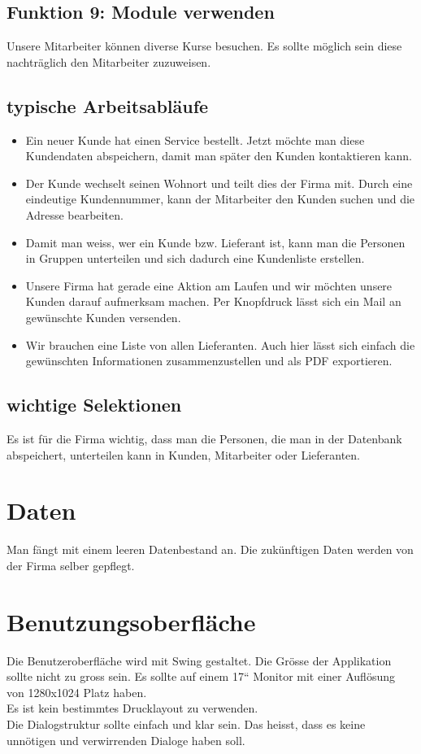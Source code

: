 \subsection{Funktion 9: Module verwenden}
Unsere Mitarbeiter können diverse Kurse besuchen. Es sollte möglich sein diese
nachträglich den Mitarbeiter zuzuweisen.

\subsection{typische Arbeitsabläufe}
\begin{itemize}
\item Ein neuer Kunde hat einen Service bestellt. Jetzt möchte man diese
Kundendaten abspeichern, damit man später den Kunden kontaktieren kann.
\item Der Kunde wechselt seinen Wohnort und teilt dies der Firma mit. Durch eine
eindeutige Kundennummer, kann der Mitarbeiter den Kunden suchen und die
Adresse bearbeiten.
\item Damit man weiss, wer ein Kunde bzw. Lieferant ist, kann man die Personen in
Gruppen unterteilen und sich dadurch eine Kundenliste erstellen.
\item Unsere Firma hat gerade eine Aktion am Laufen und wir möchten unsere
Kunden darauf aufmerksam machen. Per Knopfdruck lässt sich ein Mail an
gewünschte Kunden versenden.
\item Wir brauchen eine Liste von allen Lieferanten. Auch hier lässt sich einfach die
gewünschten Informationen zusammenzustellen und als PDF exportieren.

\end{itemize}
\subsection{wichtige Selektionen}
Es ist für die Firma wichtig, dass man die Personen, die man in der Datenbank
abspeichert, unterteilen kann in Kunden, Mitarbeiter oder Lieferanten.
%
\section{Daten}
Man fängt mit einem leeren Datenbestand an.
Die zukünftigen Daten werden von der Firma selber gepflegt.
\section{Benutzungsoberfläche}
Die Benutzeroberfläche wird mit Swing gestaltet. Die Grösse der Applikation sollte
nicht zu gross sein. Es sollte auf einem 17“ Monitor mit einer Auflösung von
1280x1024 Platz haben.\\
Es ist kein bestimmtes Drucklayout zu verwenden.\\
Die Dialogstruktur sollte einfach und klar sein. Das heisst, dass es keine unnötigen
und verwirrenden Dialoge haben soll.
